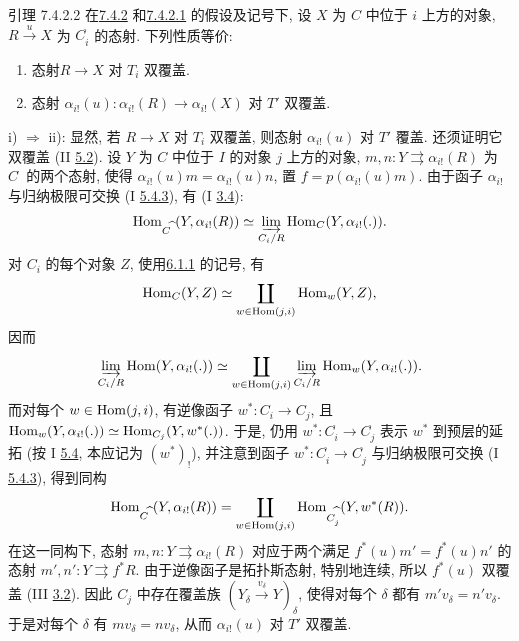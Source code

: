 \begin{enonce*}{引理 7.4.2.2}
在\hyperref[VI.prop7.4.2]{7.4.2} 和\hyperref[VI.par7.4.2.1]{7.4.2.1}
的假设及记号下, 设 $X$ 为 $C$ 中位于 $i$ 上方的对象,
$R\xrightarrow{u}X$ 为 $C^{\widehat{\phantom{,}}}_i$ 的态射.
下列性质等价:
\begin{enumerate}
\renewcommand{\theenumi}{\roman{enumi}}
\renewcommand{\labelenumi}{\theenumi)}
\item 态射\pageoriginale $R\to X$ 对 $T_i$ 双覆盖.

\item 态射 $\alpha_{i!}(u):\alpha_{i!}(R)\to\alpha_{i!}(X)$ 对 $T'$ 双覆盖.
\end{enumerate}
\end{enonce*}

i) $\Rightarrow$ ii): 显然, 若 $R\to X$ 对 $T_i$ 双覆盖,
则态射 $\alpha_{i!}(u)$ 对 $T'$ 覆盖.
还须证明它双覆盖 (II \hyperref[II.def5.2]{5.2}).
设 $Y$ 为 $C$ 中位于 $I$ 的对象 $j$ 上方的对象,
$m,n:Y\rightrightarrows\alpha_{i!}(R)$ 为 $C^{\widehat{\phantom{,}}}$ 的两个态射,
使得 $\alpha_{i!}(u)m=\alpha_{i!}(u)n$,
置 $f=p(\alpha_{i!}(u)m)$.
由于函子 $\alpha_{i!}$ 与归纳极限可交换
(I \hyperlink{sga4.exp.I.proposition.5.4.item.3}{5.4.3}),
有 (I \hyperref[I.prop3.4]{3.4}):
$$
\operatorname{Hom}_{C^{\widehat{\phantom{,}}}} (Y, \alpha_{i!} (R)) \simeq
\varinjlim_{C_{i}/R} \operatorname{Hom}_C (Y, \alpha_{i!} (.)){}.
$$
对 $C_i$ 的每个对象 $Z$, 使用\hyperref[VI.subsubsec6.1.1]{6.1.1} 的记号, 有
$$
\operatorname{Hom}_{C} (Y, Z) \simeq \coprod_{w \in \operatorname{Hom}(j, i)} \operatorname{Hom}_w (Y,
Z){},
$$
因而
$$
\varinjlim_{C_{i}/R} \operatorname{Hom} (Y, \alpha_{i!} (.)) \simeq
\coprod_{w \in \operatorname{Hom}(j, i)} \varinjlim_{C_{i}/R}
\operatorname{Hom}_{w} (Y, \alpha_{i!} (.)){}.
$$
而对每个 $w\in\operatorname{Hom}(j,i)$, 有逆像函子 $w^{\ast}:C_i\to C_j$,
且 $\operatorname{Hom}_w(Y,\alpha_{i!}(.))\simeq\operatorname{Hom}_{C_j}(Y,w^{\ast}(.))$.
于是, 仍用 $w^{\ast}:C^{\widehat{\phantom{,}}}_i\to
C^{\widehat{\phantom{,}}}_j$
表示 $w^{\ast}$ 到预层的延拓
(按 I \hyperref[I.prop5.4]{5.4}, 本应记为 $(w^{\ast})_{!}$),
并注意到函子 $w^{\ast}:C^{\widehat{\phantom{,}}}_i\to
C^{\widehat{\phantom{,}}}_j$
与归纳极限可交换 (I \hyperlink{sga4.exp.I.proposition.5.4.item.3}{5.4.3}),
得到同构
$$
\operatorname{Hom}_{C^{\widehat{\phantom{,}}}} (Y, \alpha_{i!} (R)) =
\coprod_{w \in \operatorname{Hom}(j, i)}
\operatorname{Hom}_{C^{\widehat{\phantom{,}}}_{j}}(Y,w^{\ast}(R)){}.
$$
在这一同构下, 态射 $m,n:Y\rightrightarrows\alpha_{i!}(R)$
对应于两个满足 $f^{\ast}(u)m'=f^{\ast}(u)n'$ 的态射 $m',n':Y\rightrightarrows f^{\ast}R$.
由于逆像函子是拓扑斯态射, 特别地连续,
所以 $f^{\ast}(u)$ 双覆盖 (III \hyperref[III.prop3.2]{3.2}).
因此 $C_j$ 中存在覆盖族 $(Y_{\delta}\xrightarrow{v_{\delta}}Y)_{\delta}$,
使得对每个 $\delta$ 都有 $m'v_{\delta}=n'v_{\delta}$.
于是对每个 $\delta$ 有 $mv_{\delta}=nv_{\delta}$,
从而 $\alpha_{i!}(u)$ 对 $T'$ 双覆盖.


